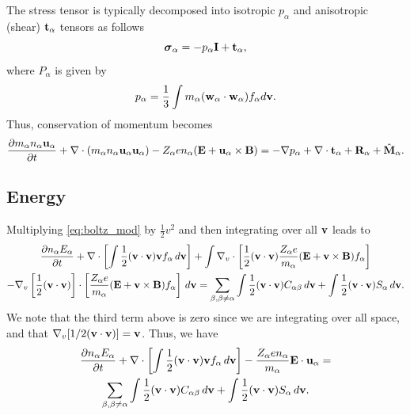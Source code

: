 \documentclass[oneside,a4paper,11pt]{report}
\begin{document}
The stress tensor is typically decomposed into isotropic $p_\alpha$ and anisotropic (shear) $\mathbf{t}_\alpha$ tensors as follows
\begin{equation}
\boldsymbol{\sigma}_\alpha = - p_\alpha \mathbf{I} + \mathbf{t}_\alpha,
\end{equation}
where $P_\alpha$ is given by
\begin{equation}
p_\alpha = \frac{1}{3} \int m_\alpha (\mathbf{w}_\alpha \cdot \mathbf{w}_\alpha) f_\alpha d\mathbf{v}.
\end{equation}
Thus, conservation of momentum becomes
\begin{equation}
\label{eq:mom_derv_6}
\frac{\partial m_\alpha n_\alpha \mathbf{u}_\alpha}{\partial t} + \nabla \cdot \left ( m_\alpha n_\alpha \mathbf{u}_\alpha \mathbf{u}_\alpha \right) - Z_\alpha e n_\alpha ( \mathbf{E} + \mathbf{u}_\alpha \times \mathbf{B} ) = - \nabla p_\alpha + \nabla \cdot \mathbf{t}_\alpha + \mathbf{R}_\alpha + \hat{\mathbf{M}}_\alpha.
\end{equation}

\subsection{Energy}
Multiplying \cref{eq:boltz_mod} by $\frac{1}{2} v^2$ and then integrating over all $\mathbf{v}$ leads to
\begin{multline}
\label{eq:energy_derv_1}
\frac{\partial n_\alpha E_\alpha}{\partial t} + \nabla \cdot \left [ \int \frac{1}{2} (\mathbf{v} \cdot \mathbf{v}) \mathbf{v} f_\alpha \, d\mathbf{v} \right ] + \int \nabla_v \cdot \left [ \frac{1}{2} (\mathbf{v} \cdot \mathbf{v}) \frac{Z_\alpha e}{m_\alpha} ( \mathbf{E} + \mathbf{v} \times \mathbf{B} ) f_\alpha \right ] \\
- \nabla_v \left [ \frac{1}{2} (\mathbf{v} \cdot \mathbf{v}) \right ] \cdot \left [ \frac{Z_\alpha e}{m_\alpha} ( \mathbf{E} + \mathbf{v} \times \mathbf{B} ) f_\alpha \right ] \, d\mathbf{v} = \sum_{\beta, \beta \ne \alpha} \int \frac{1}{2} (\mathbf{v} \cdot \mathbf{v}) C_{\alpha \beta} \, d\mathbf{v} + \int \frac{1}{2} (\mathbf{v} \cdot \mathbf{v}) S_\alpha \, d\mathbf{v}.
\end{multline}
We note that the third term above is zero since we are integrating over all space, and that $\nabla_v [ 1/2 (\mathbf{v} \cdot \mathbf{v} ) ] = \mathbf{v}$. Thus, we have
\begin{multline}
\label{eq:energy_derv_2}
\frac{\partial n_\alpha E_\alpha}{\partial t} + \nabla \cdot \left [ \int \frac{1}{2} (\mathbf{v} \cdot \mathbf{v}) \mathbf{v} f_\alpha \, d\mathbf{v} \right ] - \frac{Z_\alpha e n_\alpha}{m_\alpha} \mathbf{E} \cdot \mathbf{u}_\alpha =\\
\sum_{\beta, \beta \ne \alpha} \int \frac{1}{2} (\mathbf{v} \cdot \mathbf{v}) C_{\alpha \beta} \, d\mathbf{v} + \int \frac{1}{2} (\mathbf{v} \cdot \mathbf{v}) S_\alpha \, d\mathbf{v}.
\end{multline}
\end{document}

